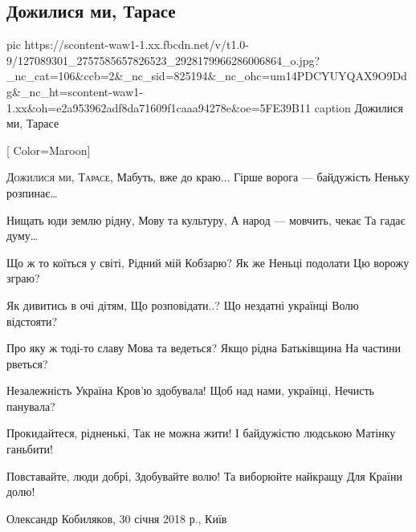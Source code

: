  
 
 
 
 
 
\subsection{Дожилися ми, Тарасе}
\label{sec:24_11_2020.fb.kobyljakov_oleksandr.1.taras}

\ifcmt
pic https://scontent-waw1-1.xx.fbcdn.net/v/t1.0-9/127089301_2757585657826523_2928179966286006864_o.jpg?_nc_cat=106&ccb=2&_nc_sid=825194&_nc_ohc=um14PDCYUYQAX9O9Ddg&_nc_ht=scontent-waw1-1.xx&oh=e2a953962adf8da71609f1caaa94278e&oe=5FE39B11
caption Дожилися ми, Тарасе
\fi


\setmainfont{PT Serif}
\newfontface{}[
  Color=Maroon]
\renewcommand{\LettrineFontHook}{\init}
\renewcommand*{\DefaultLoversize}{.18}
\renewcommand*{\DefaultLhang}{.1}

\begin{multicols}{2}
	\obeycr
\lettrine[lines=3]{Д}{ожилися ми, Тарасе},
Мабуть, вже до краю...
Гірше ворога --- байдужість
Неньку розпинає…

Нищать юди землю рідну,
Мову та культуру,
А народ --- мовчить, чекає
Та гадає думу…

Що ж то коїться у світі,
Рідний мій Кобзарю?
Як же Неньці подолати
Цю ворожу зграю?

Як дивитись в очі дітям,
Що розповідати..?
Що нездатні українці
Волю відстояти?

Про яку ж тоді-то славу
Мова та ведеться?
Якщо рідна Батьківщина
На частини рветься?

Незалежність Україна
Кров’ю здобувала!
Щоб над нами, українці,
Нечисть панувала?

Прокидайтеся, рідненькі,
Так не можна жити!
І байдужістю людською
Матінку ганьбити!

Повставайте, люди добрі,
Здобувайте волю!
Та виборюйте найкращу
Для Країни долю!

Олександр Кобиляков, 30 січня 2018 р., Київ
	\restorecr
\end{multicols}
